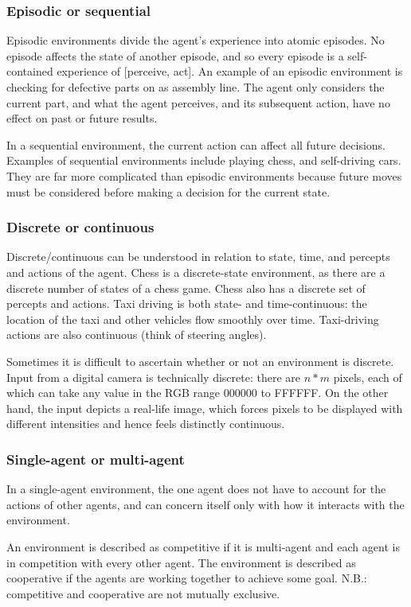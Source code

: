 \subsubsection{Episodic or sequential}
Episodic environments divide the agent's experience into atomic episodes. No
episode affects the state of another episode, and so every episode is a
self-contained experience of [perceive, act]. An example of an episodic
environment is checking for defective parts on as assembly line. The agent only
considers the current part, and what the agent perceives, and its subsequent
action, have no effect on past or future results.

In a sequential environment, the current action can affect all future
decisions. Examples of sequential environments include playing chess, and
self-driving cars. They are far more complicated than episodic environments
because future moves must be considered before making a decision for the
current state.

\subsubsection{Discrete or continuous}
Discrete/continuous can be understood in relation to state, time, and percepts
and actions of the agent. Chess is a discrete-state environment, as there are a
discrete number of states of a chess game. Chess also has a discrete set of
percepts and actions. Taxi driving is both state- and time-continuous: the
location of the taxi and other vehicles flow smoothly over time. Taxi-driving
actions are also continuous (think of steering angles).

Sometimes it is difficult to ascertain whether or not an environment is
discrete. Input from a digital camera is technically discrete: there are $n*m$
pixels, each of which can take any value in the RGB range 000000 to FFFFFF. On
the other hand, the input depicts a real-life image, which forces pixels to be
displayed with different intensities and hence feels distinctly continuous.

\subsubsection{Single-agent or multi-agent}
In a single-agent environment, the one agent does not have to account for the
actions of other agents, and can concern itself only with how it interacts with
the environment.

An environment is described as competitive if it is multi-agent and each agent
is in competition with every other agent. The environment is described as
cooperative if the agents are working together to achieve some goal. N.B.:
competitive and cooperative are not mutually exclusive.

